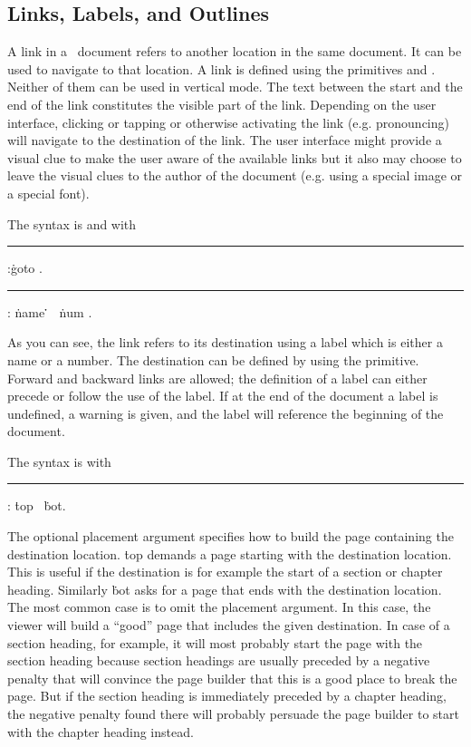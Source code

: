 \subsection{Links, Labels, and Outlines}
A link in a \HINT\ document refers to another location in the same document.
It can be used to navigate to that location.
A link is defined using the primitives 
and .
Neither of them can be used in vertical mode.
The text between the start and the end of the link
constitutes the visible part of the link. Depending on the user interface, clicking
or tapping or otherwise activating the link (e.g. pronouncing)
will navigate to the destination of the link.
The user interface might provide a visual clue to make the user aware of the
available links but it also may choose to leave the visual clues to the author
of the document (e.g. using a special image or a special font).

The syntax is 
  
and
with

\medskip
\rule {}:\.{goto} .
\rule {}:
  \.{name} \.{\LB}\.{\RB} \OR\ \.{num} .
\medskip

As you can see, the link refers to its destination using a label
which is either a name or a number.
The destination can be defined by using the 
 primitive.
Forward and backward links are allowed; the definition of a label can either
precede or follow the use of the label. If at the end of the document a label
is undefined, a warning is given, and the label will reference the beginning of the
document.

The syntax is
  
with

\medskip
\rule{}:
\.{top} \OR\ \.{bot}.
\medskip

The optional placement argument specifies how to build the page 
containing the destination location. \.{top} demands
a page starting with the destination location. This is useful
if the destination is for example the start of a section or chapter heading.
Similarly \.{bot} asks for a page that ends with the destination location.
The most common case is to omit the placement argument. In this case, the
viewer will build a ``good'' page that includes the given destination.
In case of a section heading, for example, it will most probably start the
page with the section heading because section headings are usually preceded
by a negative penalty that will convince the page builder that this is a good
place to break the page. But if the section heading is immediately preceded
by a chapter heading, the negative penalty found there will probably
persuade the page builder to start with the chapter heading instead.

